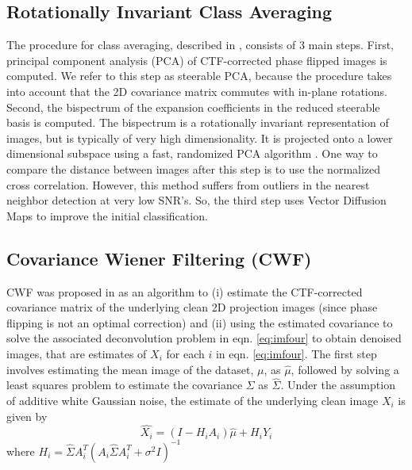 \documentclass{article}
\begin{document}
\subsection{Rotationally Invariant Class Averaging}
The procedure for class averaging, described in \cite{zhao}, consists of 3 main steps. First, principal component analysis (PCA) of CTF-corrected phase flipped images is computed. We refer to this step as steerable PCA, because the procedure takes into account that the 2D covariance matrix commutes with in-plane rotations. Second, the bispectrum of the expansion coefficients in the reduced steerable basis is computed. The bispectrum is a rotationally invariant representation of images, but is typically of very high dimensionality. It is projected onto a lower dimensional subspace using a fast, randomized PCA algorithm \cite{rokhlin}. One way to compare the distance between images after this step is to use the normalized cross correlation. However, this method suffers from outliers in the nearest neighbor detection at very low SNR's. So, the third step uses Vector Diffusion Maps\cite{vdm} to improve the initial classification.


\subsection{Covariance Wiener Filtering (CWF)}
CWF was proposed in \cite{cwf} as an algorithm to (i) estimate the CTF-corrected covariance matrix of the underlying clean 2D projection images (since phase flipping is not an optimal correction)  and (ii) using the estimated covariance to solve the associated deconvolution problem in eqn. \ref{eq:imfour} to obtain denoised images, that are estimates of $X_i$ for each $i$ in 
eqn. \ref{eq:imfour}. The first step involves estimating the mean image of the dataset, $\mu$, as $\hat{\mu}$, followed by solving a least squares problem to estimate the covariance $\Sigma$ as $\hat{\Sigma}$. Under the assumption of additive white Gaussian noise, the estimate of the underlying clean image $X_i$ is given by
\begin{equation}
\hat{X_i}=(I-H_iA_i)\hat{\mu} + H_iY_i
\end{equation}
where $H_i=\hat{\Sigma}A_i^T(A_i \hat{\Sigma}A_i^T + \sigma^2 I)^{-1}$
%
\end{document}
